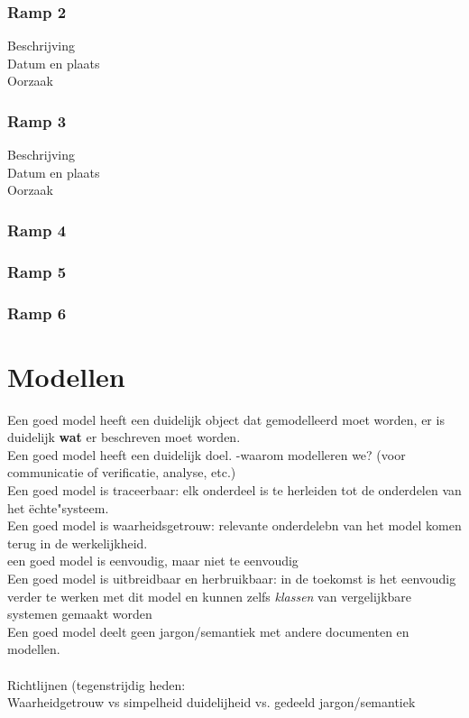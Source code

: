 \documentclass{article}%
\begin{document}
\subsubsection{Ramp 2}
\begin{description}
\item[Beschrijving]
\item[Datum en plaats] 
\item[Oorzaak]
\end{description}

\subsubsection{Ramp 3}
\begin{description}
\item[Beschrijving]
\item[Datum en plaats] 
\item[Oorzaak]
\end{description}

\subsubsection{Ramp 4}
\subsubsection{Ramp 5}
\subsubsection{Ramp 6}

\section{Modellen}
Een goed model heeft een duidelijk object dat gemodelleerd moet worden, er is duidelijk \textbf{wat} er beschreven moet worden.
\\
Een goed model heeft een duidelijk doel.
-waarom modelleren we? (voor communicatie of verificatie, analyse, etc.)
\\
Een goed model is traceerbaar: elk onderdeel is te herleiden tot de onderdelen van het ëchte"systeem.
\\
Een goed model is waarheidsgetrouw: relevante onderdelebn van het model komen terug in de werkelijkheid.
\\
een goed model is eenvoudig, maar niet te eenvoudig
\\
Een goed model is uitbreidbaar en herbruikbaar: in de toekomst is het eenvoudig verder te werken met dit model en kunnen zelfs \textit{klassen} van vergelijkbare  systemen gemaakt worden
\\
Een goed model deelt geen jargon/semantiek met andere documenten en modellen.
\\\\
Richtlijnen (tegenstrijdig heden:
\\
Waarheidgetrouw vs simpelheid
duidelijheid vs. gedeeld jargon/semantiek
\end{document}
